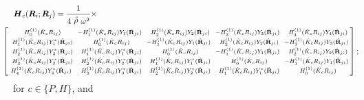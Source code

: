 \begin{eqnarray} \label{PaDef0}
\lefteqn{{\bmi H}_{c }({\bmi R}_{i};{\bmi R}_{j})=\frac{1}{4 \rf{\rho} \omega^2}\times}\\
&&\!\!\!\!\!\!\!\!\!\!\!\!\!\!
\left[{\begin{array}{ccccc}
\scriptstyle 
{H}^{(1)}_{0}(\hat{K}_{c}{R}_{ij})&\scriptstyle\!\!\! -{H}^{(1)}_{1}(\hat{K}_{c}{R}_{ij})
Y_{1}(\hat{\bf R}_{ji})&\scriptstyle{H}^{(1)}_{2}(\hat{K}_{c}{R}_{ij})
Y_{2}(\hat{\bf R}_{ji})&\scriptstyle\!\!\! -{H}^{(1)}_{3}(\hat{K}_{c}{R}_{ij})
Y_{3}(\hat{\bf R}_{ji})&\scriptstyle{H}^{(1)}_{4}(\hat{K}_{c}{R}_{ij})
Y_{4}(\hat{\bf R}_{ji})\\ \scriptstyle {H}^{(1)}_{1}(\hat{K}_{c}{R}_{ij})
Y_{1}^{\ast}(\hat{\bf R}_{ji})&\scriptstyle{H}^{(1)}_{0}(\hat{K}_{c}{R}_{ij})&\scriptstyle\!\!\! -{H}^{(1)}_{1}
(\hat{K}_{c}{R}_{ij})Y_{1}(\hat{\bf R}_{ji})&\scriptstyle{H}^{(1)}_{2}(\hat{K}_{c}{R}_{ij})
Y_{2}(\hat{\bf R}_{ji})&\scriptstyle\!\!\! -{H}^{(1)}_{3}(\hat{K}_{c}{R}_{ij})
Y_{3}(\hat{\bf R}_{ji})\\ \scriptstyle {H}^{(1)}_{2}(\hat{K}_{c}{R}_{ij})
Y_{2}^{\ast}(\hat{\bf R}_{ji})&\scriptstyle{H}^{(1)}_{1}(\hat{K}_{c}{R}_{ij})
Y_{1}^{\ast}(\hat{\bf R}_{ji})&\scriptstyle{H}^{(1)}_{0}(\hat{K}_{c}{R}_{ij})&\scriptstyle\!\!\! -{H}^{(1)}_{1}
(\hat{K}_{c}{R}_{ij})
Y_{1}(\hat{\bf R}_{ji})&\scriptstyle{H}^{(1)}_{2}(\hat{K}_{c}{R}_{ij})
Y_{2}(\hat{\bf R}_{ji})\\ \scriptstyle {H}^{(1)}_{3}(\hat{K}_{c}{R}_{ij})
Y_{3}^{\ast}(\hat{\bf R}_{ji})&\scriptstyle{H}^{(1)}_{2}(\hat{K}_{c}{R}_{ij})
Y_{2}^{\ast}(\hat{\bf R}_{ji})&\scriptstyle{H}^{(1)}_{1}(\hat{K}_{c}{R}_{ij})
Y_{1}^{\ast}(\hat{\bf R}_{ji})&\scriptstyle{H}^{(1)}_{0}(\hat{K}_{c}{R}_{ij})&\scriptstyle\!\!\! -{H}^{(1)}_{1}
(\hat{K}_{c}{R}_{ij})Y_{1}(\hat{\bf R}_{ji})\\\!\! \scriptstyle {H}^{(1)}_{4}
(\hat{K}_{c}{R}_{ij})Y_{4}^{\ast}(\hat{\bf R}_{ji})&\scriptstyle{H}^{(1)}_{3}
(\hat{K}_{c}{R}_{ij})Y_{3}^{\ast}(\hat{\bf R}_{ji})&\scriptstyle{H}^{(1)}_{2}
(\hat{K}_{c}{R}_{ij})Y_{2}^{\ast}(\hat{\bf R}_{ji})&\scriptstyle{H}^{(1)}_{1}
(\hat{K}_{c}{R}_{ij})Y_{1}^{\ast}(\hat{\bf R}_{ji})&\scriptstyle{H}^{(1)}_{0}
(\hat{K}_{c}{R}_{ij})\end{array}}\!\!\right];\nonumber 
\end{eqnarray} 
for $c\in \{ P,H\}$, and
